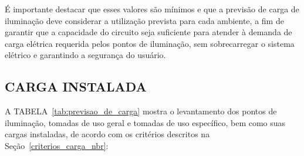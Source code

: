 É importante destacar que esses valores são mínimos e que a previsão de carga de iluminação deve considerar a utilização prevista para cada ambiente, a fim de garantir que a capacidade do circuito seja suficiente para atender à demanda de carga elétrica requerida pelos pontos de iluminação, sem sobrecarregar o sistema elétrico e garantindo a segurança do usuário.

\subsection{CARGA INSTALADA}

A TABELA~\ref{tab:previsao_de_carga} mostra o levantamento dos pontos de iluminação, tomadas de uso geral e tomadas de uso específico, bem como suas cargas instaladas, de acordo com os critérios descritos na Seção~\ref{criterios_carga_nbr}:

